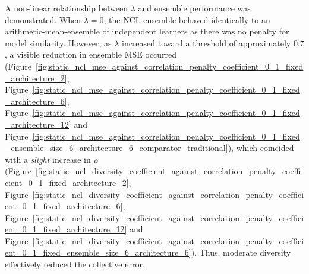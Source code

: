 A non-linear relationship between $\lambda$ and ensemble performance was demonstrated. When $\lambda = 0$, the NCL ensemble behaved identically to an arithmetic-mean-ensemble of independent learners as there was no penalty for model similarity. However, as $\lambda$ increased toward a threshold of approximately $0.7$, a visible reduction in ensemble MSE occurred (Figure~\ref{fig:static_ncl_mse_against_correlation_penalty_coefficient_0_1_fixed_architecture_2}, Figure~\ref{fig:static_ncl_mse_against_correlation_penalty_coefficient_0_1_fixed_architecture_6}, Figure~\ref{fig:static_ncl_mse_against_correlation_penalty_coefficient_0_1_fixed_architecture_12} and Figure~\ref{fig:static_ncl_mse_against_correlation_penalty_coefficient_0_1_fixed_ensemble_size_6_architecture_6_comparator_traditional}), which coincided with a \textit{slight} increase in $\rho$ (Figure~\ref{fig:static_ncl_diversity_coefficient_against_correlation_penalty_coefficient_0_1_fixed_architecture_2}, Figure~\ref{fig:static_ncl_diversity_coefficient_against_correlation_penalty_coefficient_0_1_fixed_architecture_6}, Figure~\ref{fig:static_ncl_diversity_coefficient_against_correlation_penalty_coefficient_0_1_fixed_architecture_12} and Figure~\ref{fig:static_ncl_diversity_coefficient_against_correlation_penalty_coefficient_0_1_fixed_ensemble_size_6_architecture_6}). Thus, moderate diversity effectively reduced the collective error. 

